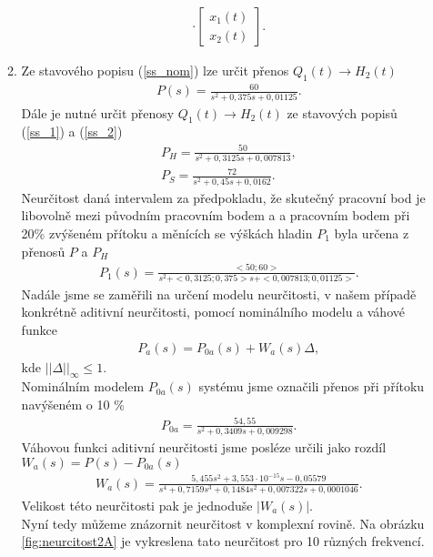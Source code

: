 \documentclass[12pt,a4paper]{article}
\begin{document}
\begin{enumerate}[I.]
\begin{enumerate}[1.]
\begin{gather}
			\cdot \left[\begin{array}{c}
			x_1(t) \\
			x_2(t)
			\end{array}\right]. \label{ss_2}
			\end{gather}
			\item Ze stavového popisu (\ref{ss_nom}) lze určit přenos $Q_1(t) \rightarrow H_2(t)$
			\begin{gather*}
			P(s) = \frac{60}{s^2 + 0{,}375s + 0{,}01125}.
			\end{gather*}
			Dále je nutné určit přenosy $Q_1(t) \rightarrow H_2(t)$ ze stavových popisů (\ref{ss_1}) a (\ref{ss_2})
			\begin{gather*}
			P_H = \frac{50}{s^2 + 0{,}3125s + 0{,}007813},\\
			P_S = \frac{72}{s^2 + 0{,}45s + 0{,}0162}.
			\end{gather*}
			Neurčitost daná intervalem za předpokladu, že skutečný pracovní bod je  libovolně mezi původním pracovním bodem a a pracovním bodem při 20\% zvýšeném přítoku a měnících se výškách hladin $P_1$ byla určena z přenosů $P$ a $P_H$
			\begin{gather*}
			P_1(s) = \frac{<50;60>}{s^2 + <0{,}3125;0{,}375>s + <0{,}007813;0{,}01125>}.
			\end{gather*}
			Nadále jsme se zaměřili na určení modelu neurčitosti, v našem případě konkrétně aditivní neurčitosti, pomocí nominálního modelu a váhové funkce
			\begin{gather*}
			P_a(s) = P_{0a}(s) + W_a(s)\Delta,
			\end{gather*}
			kde $||\Delta||_\infty \leq 1$.\\
			Nominálním modelem $P_{0a}(s)$ systému jsme označili přenos při přítoku navýšeném o 10 \%
			\begin{gather*}
			P_{0a} = \frac{54{,}55}{s^2 + 0{,}3409s + 0{,}009298}.
			\end{gather*}
			Váhovou funkci aditivní neurčitosti jsme posléze určili jako rozdíl $W_a(s) = P(s)-P_{0a}(s)$
			\begin{gather*}
			W_a(s) = \frac{5{,}455s^2 + 3{,}553\cdot 10^{-15}s - 0{,}05579}{s^4 + 0{,}7159s^3 + 0{,}1484s^2 + 0{,}007322s + 0{,}0001046}.
			\end{gather*}
			Velikost této neurčitosti pak je jednoduše $|W_a(s)|$.\\
			Nyní tedy můžeme znázornit neurčitost v komplexní rovině. Na obrázku \ref{fig:neurcitost2A} je vykreslena tato neurčitost pro 10 různých frekvencí.
			\begin{figure}[H]

\end{figure}
\end{enumerate}
\end{enumerate}
\end{document}
